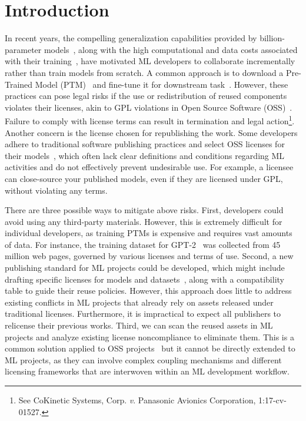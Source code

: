\section{Introduction}
\label{sec:intro}
In recent years, the compelling generalization capabilities provided by billion-parameter models~\cite{wei2023inverse}, along with the high computational and data costs associated with their training~\cite{maslej2024aiindex}, have motivated ML developers to collaborate incrementally rather than train models from scratch.
A common approach is to download a Pre-Trained Model (PTM)~\cite{jiang2023empirical} and fine-tune it for downstream task~\cite{hu2022lora}.
However, these practices can pose legal risks if the use or redistribution of reused components violates their licenses, akin to GPL violations in Open Source Software (OSS)~\cite{mathur2012empirical}.
Failure to comply with license terms can result in termination and legal action\footnote{See CoKinetic Systems, Corp. \textit{v}. Panasonic Avionics Corporation, 1:17-cv-01527.}.
Another concern is the license chosen for republishing the work.
Some developers adhere to traditional software publishing practices and select OSS licenses for their models~\cite{devlin2019bert,ni2022expanding, duan2025position}, which often lack clear definitions and conditions regarding ML activities and do not effectively prevent undesirable use.
For example, a licensee can close-source your published models, even if they are licensed under GPL, without violating any terms.

There are three possible ways to mitigate above risks.
First, developers could avoid using any third-party materials. However, this is extremely difficult for individual developers, as training PTMs is expensive and requires vast amounts of data. For instance, the training dataset for GPT-2~\cite{radford2019language} was collected from 45 million web pages, governed by various licenses and terms of use.
Second, a new publishing standard for ML projects could be developed, which might include drafting specific licenses for models and datasets~\cite{benjamin2019towards,contractor2022behavioral}, along with a compatibility table to guide their reuse policies. 
However, this approach does little to address existing conflicts in ML projects that already rely on assets released under traditional licenses. 
Furthermore, it is impractical to expect all publishers to relicense their previous works.
Third, we can scan the reused assets in ML projects and analyze existing license noncompliance to eliminate them. 
This is a common solution applied to OSS projects~\cite{jaeger2017fossology} but it cannot be directly extended to ML projects, as they can involve complex coupling mechanisms and different licensing frameworks that are interwoven within an ML development workflow.

